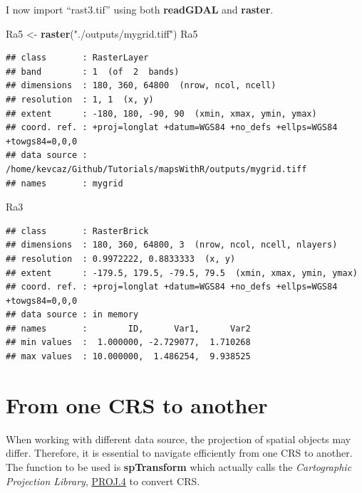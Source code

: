 \documentclass[]{report}
\newenvironment{Shaded}{\begin{snugshade}}{\end{snugshade}}
\newcommand{\KeywordTok}[1]{\textcolor[rgb]{0.13,0.29,0.53}{\textbf{{#1}}}}
\newcommand{\StringTok}[1]{\textcolor[rgb]{0.31,0.60,0.02}{{#1}}}
\newcommand{\NormalTok}[1]{{#1}}
\begin{document}
I now import ``rast3.tif'' using both \textbf{readGDAL} and
\textbf{raster}.

\begin{Shaded}
\begin{Highlighting}[]
\NormalTok{Ra5 <-}\StringTok{ }\KeywordTok{raster}\NormalTok{(}\StringTok{"./outputs/mygrid.tiff"}\NormalTok{)}
\NormalTok{Ra5}
\end{Highlighting}
\end{Shaded}

\begin{verbatim}
## class       : RasterLayer 
## band        : 1  (of  2  bands)
## dimensions  : 180, 360, 64800  (nrow, ncol, ncell)
## resolution  : 1, 1  (x, y)
## extent      : -180, 180, -90, 90  (xmin, xmax, ymin, ymax)
## coord. ref. : +proj=longlat +datum=WGS84 +no_defs +ellps=WGS84 +towgs84=0,0,0 
## data source : /home/kevcaz/Github/Tutorials/mapsWithR/outputs/mygrid.tiff 
## names       : mygrid
\end{verbatim}

\begin{Shaded}
\begin{Highlighting}[]
\NormalTok{Ra3}
\end{Highlighting}
\end{Shaded}

\begin{verbatim}
## class       : RasterBrick 
## dimensions  : 180, 360, 64800, 3  (nrow, ncol, ncell, nlayers)
## resolution  : 0.9972222, 0.8833333  (x, y)
## extent      : -179.5, 179.5, -79.5, 79.5  (xmin, xmax, ymin, ymax)
## coord. ref. : +proj=longlat +datum=WGS84 +no_defs +ellps=WGS84 +towgs84=0,0,0 
## data source : in memory
## names       :        ID,      Var1,      Var2 
## min values  :  1.000000, -2.729077,  1.710268 
## max values  : 10.000000,  1.486254,  9.938525
\end{verbatim}

\section{From one CRS to another}\label{from-one-crs-to-another}

When working with different data source, the projection of spatial
objects may differ. Therefore, it is essential to navigate efficiently
from one CRS to another. The function to be used is \textbf{spTransform}
which actually calls the \emph{Cartographic Projection Library},
\href{https://trac.osgeo.org/proj/}{PROJ.4} to convert CRS.
\end{document}
